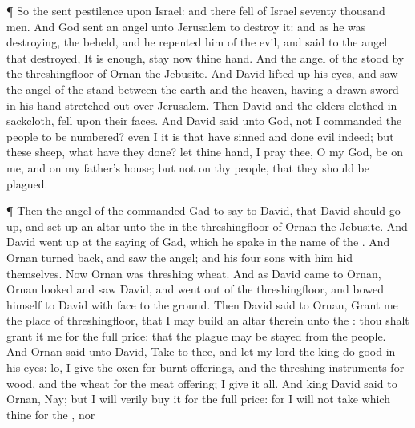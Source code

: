 {\par }{\PP {}¶ So the
{}
sent
pestilence upon
Israel: and there
fell of
Israel
seventy
thousand
men.
And
God
sent an
angel unto
Jerusalem to
destroy it: and as he was
destroying, the
{}
beheld, and he
repented him of the
evil, and
said to the
angel that
destroyed, It is
enough,
stay now thine
hand. And the
angel of the
{}
stood by the
threshingfloor of
Ornan the
Jebusite.
And
David lifted
up his
eyes, and
saw the
angel of the
{}
stand between the
earth and the
heaven, having a
drawn
sword in his
hand stretched
out over
Jerusalem. Then
David and the
elders
{}
clothed in
sackcloth,
fell upon their
faces.
And
David
said unto
God,
{} not I
{}
commanded the
people to be
numbered? even I it is that have
sinned and done
evil
indeed; but
{} these
sheep, what have they
done? let thine
hand, I pray thee, O
{} my
God, be on me, and on my
father’s
house; but not on thy
people, that they should be
plagued.
\par }{\PP {}¶ Then the
angel of the
{}
commanded
Gad to
say to
David, that
David should go
up, and set
up an
altar unto the
{} in the
threshingfloor of
Ornan the
Jebusite.
And
David went
up at the
saying of
Gad, which he
spake in the
name of the
{}.
And
Ornan turned
back, and
saw the
angel; and his
four
sons with him
hid themselves. Now
Ornan was
threshing
wheat.
And as
David
came to
Ornan,
Ornan
looked and
saw
David, and went
out of the
threshingfloor, and
bowed himself to
David with
{}
face to the
ground.
Then
David
said to
Ornan,
Grant me the
place of
{}
threshingfloor, that I may
build an
altar therein unto the
{}: thou shalt
grant it me for the
full
price: that the
plague may be
stayed from the
people.
And
Ornan
said unto
David,
Take
{} to thee, and let my
lord the
king
do
{}
good in his
eyes:
lo, I
give
{} the
oxen
{} for burnt
offerings, and the threshing
instruments for
wood, and the
wheat for the meat
offering; I
give it all.
And
king
David
said to
Ornan, Nay; but I will
verily
buy it for the
full
price: for I will not
take
{} which
{} thine for the
{}, nor
}
